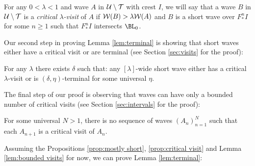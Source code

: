 \documentclass[12pt]{amsart}
\begin{document}
For any $0< \lambda< 1$ and wave $A$ in $\mathcal U\setminus \mathcal T$ with crest $I$, we will say that a wave $B$ in $\mathcal U\setminus \mathcal T$ is a 
\textit{critical $\lambda$-visit}  of $A$ if $\mathcal W(B)> \lambda\mathcal W(A)$ and 
$B$ is a short wave over $F_*^nI$ for some $n\geq 1$ such that $F_*^nI$ intersects $\BL_0$.

Our second step in proving Lemma \ref{lem:terminal} is showing that short waves either have a critical visit or are terminal (see Section \ref{sec:visits} for the proof):
\begin{prop}\label{prop:critical visit}
	For any $\lambda$ there exists $\delta$ such that: any $[\lambda]$-wide short wave either has a critical $\lambda$-visit or is $(\delta, \eta)$-terminal for some universal $\eta$.
\end{prop}

The final step of our proof is observing that waves can have only a bounded number of critical visits (see Section \ref{sec:intervals} for the proof):
\begin{lemma}\label{lem:bounded visits}
	For some universal $N> 1$, there is no sequence of  waves $(A_n)_{n=1}^N$  such that each $A_{n+1}$ is a critical visit of $A_n$. 
\end{lemma}

Assuming the Propositions \ref{prop:mostly short}, \ref{prop:critical visit} and Lemma \ref{lem:bounded visits} for now, we can prove Lemma \ref{lem:terminal}:
\end{document}

